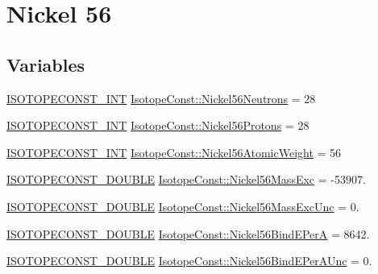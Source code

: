 \hypertarget{group___isotope_const-_nickel-_ni56}{}\section{Nickel 56}
\label{group___isotope_const-_nickel-_ni56}
\subsection*{Variables}
\begin{DoxyCompactItemize}
\item 
\mbox{\hyperlink{group___isotope_const-_macros_ga5f18360b3e99483a35c32d789e62621c}{I\+S\+O\+T\+O\+P\+E\+C\+O\+N\+S\+T\+\_\+\+I\+NT}} \mbox{\hyperlink{group___isotope_const-_nickel-_ni56_gade188e6e8072db6b4d59d4369569ee26}{Isotope\+Const\+::\+Nickel56\+Neutrons}} = 28
\item 
\mbox{\hyperlink{group___isotope_const-_macros_ga5f18360b3e99483a35c32d789e62621c}{I\+S\+O\+T\+O\+P\+E\+C\+O\+N\+S\+T\+\_\+\+I\+NT}} \mbox{\hyperlink{group___isotope_const-_nickel-_ni56_gaf9044e755c97c9b79456b11ad7ef2b2f}{Isotope\+Const\+::\+Nickel56\+Protons}} = 28
\item 
\mbox{\hyperlink{group___isotope_const-_macros_ga5f18360b3e99483a35c32d789e62621c}{I\+S\+O\+T\+O\+P\+E\+C\+O\+N\+S\+T\+\_\+\+I\+NT}} \mbox{\hyperlink{group___isotope_const-_nickel-_ni56_ga3a33952c46ecfea0c2b22a1b23b4dcc3}{Isotope\+Const\+::\+Nickel56\+Atomic\+Weight}} = 56
\item 
\mbox{\hyperlink{group___isotope_const-_macros_ga8f45a7272ce02c0b4c65c44636ed719a}{I\+S\+O\+T\+O\+P\+E\+C\+O\+N\+S\+T\+\_\+\+D\+O\+U\+B\+LE}} \mbox{\hyperlink{group___isotope_const-_nickel-_ni56_ga9233630710107fdd2ed850264b84744d}{Isotope\+Const\+::\+Nickel56\+Mass\+Exc}} = -\/53907.
\item 
\mbox{\hyperlink{group___isotope_const-_macros_ga8f45a7272ce02c0b4c65c44636ed719a}{I\+S\+O\+T\+O\+P\+E\+C\+O\+N\+S\+T\+\_\+\+D\+O\+U\+B\+LE}} \mbox{\hyperlink{group___isotope_const-_nickel-_ni56_gaa1d1e6a96163832109e7960f59ff431b}{Isotope\+Const\+::\+Nickel56\+Mass\+Exc\+Unc}} = 0.
\item 
\mbox{\hyperlink{group___isotope_const-_macros_ga8f45a7272ce02c0b4c65c44636ed719a}{I\+S\+O\+T\+O\+P\+E\+C\+O\+N\+S\+T\+\_\+\+D\+O\+U\+B\+LE}} \mbox{\hyperlink{group___isotope_const-_nickel-_ni56_ga0a8b79f1c56e3e5294df1b661a0cea37}{Isotope\+Const\+::\+Nickel56\+Bind\+E\+PerA}} = 8642.
\item 
\mbox{\hyperlink{group___isotope_const-_macros_ga8f45a7272ce02c0b4c65c44636ed719a}{I\+S\+O\+T\+O\+P\+E\+C\+O\+N\+S\+T\+\_\+\+D\+O\+U\+B\+LE}} \mbox{\hyperlink{group___isotope_const-_nickel-_ni56_ga825df14d9cfb407a1baaf60d994a18b3}{Isotope\+Const\+::\+Nickel56\+Bind\+E\+Per\+A\+Unc}} = 0.

\end{DoxyCompactItemize}
